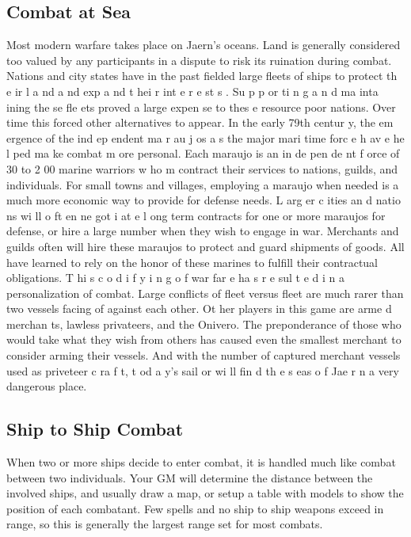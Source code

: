 \begin{multicols*}{2}
\section{Combat at Sea}
Most modern warfare takes place on Jaern’s oceans.
Land is generally considered too valued by any participants in
a dispute to risk its ruination during combat. Nations and city
states have in the past fielded large fleets of ships to protect
th e ir l a nd a nd exp a nd t hei r int e r e st s . Su p p or ti n g a n d
ma inta ining the se fle ets proved a large expen se to thes e
resource poor nations. Over time this forced other alternatives
to appear.
In the early 79th centur y, the em ergence of the
ind ep endent ma r au j os a s the major mari time forc e h av e
he l ped ma ke combat m ore personal. Each maraujo is an
in de pen de nt f orce of 30 to 2 00 marine warriors w ho m
contract their services to nations, guilds, and individuals. For
small towns and villages, employing a maraujo when needed
is a much more economic way to provide for defense needs.
L arg er c ities an d natio ns wi ll o ft en ne got i at e l ong term
contracts for one or more maraujos for defense, or hire a large
number when they wish to engage in war. Merchants and
guilds often will hire these maraujos to protect and guard 
shipments of goods. All have learned to rely on the honor of
these marines to fulfill their contractual obligations.
T hi s c o d i f y i n g o f war far e ha s r e sul t e d i n a
personalization of combat. Large conflicts of fleet versus fleet
are much rarer than two vessels facing of against each other.
Ot her players in this game are arme d merchan ts, lawless
privateers, and the Onivero. The preponderance of those who
would take what they wish from others has caused even the
smallest merchant to consider arming their vessels. And with
the number of captured merchant vessels used as priveteer
c ra f t, t od a y’s sail or wi ll fin d th e s eas o f Jae r n a very
dangerous place.
\subsection{Ship to Ship Combat}
When two or more ships decide to enter combat, it is handled much like combat between two individuals. Your GM will determine the distance between the involved ships, and usually draw a map, or setup a table with models to show the position of each combatant. Few spells and no ship to ship weapons exceed  in range, so this is generally the
largest range set for most combats.


\end{multicols*}
